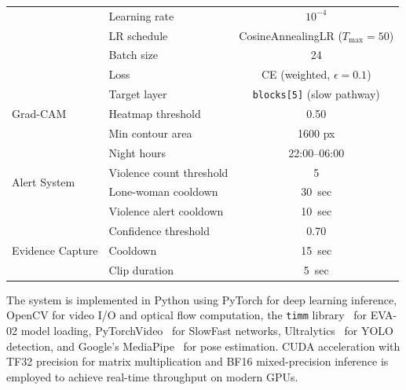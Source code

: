 \documentclass[11pt,a4paper]{article}
\begin{document}
\begin{table}[H]
\begin{tabular}{@{}llc@{}}
& Learning rate & $10^{-4}$ \\
& LR schedule & CosineAnnealingLR ($T_{\max}\!=\!50$) \\
& Batch size & 24 \\
& Loss & CE (weighted, $\epsilon\!=\!0.1$) \\
\midrule
\multirow{3}{*}{Grad-CAM} & Target layer & \texttt{blocks[5]} (slow pathway) \\
& Heatmap threshold & 0.50 \\
& Min contour area & 1600 px \\
\midrule
\multirow{4}{*}{Alert System} & Night hours & 22:00--06:00 \\
& Violence count threshold & 5 \\
& Lone-woman cooldown & 30~sec \\
& Violence alert cooldown & 10~sec \\
\midrule
\multirow{3}{*}{Evidence Capture} & Confidence threshold & 0.70 \\
& Cooldown & 15~sec \\
& Clip duration & 5~sec \\
\bottomrule
\end{tabular}
\end{table}

The system is implemented in Python using PyTorch for deep learning inference, OpenCV for video I/O and optical flow computation, the \texttt{timm} library~\cite{timm} for EVA-02 model loading, PyTorchVideo~\cite{pytorchvideo} for SlowFast networks, Ultralytics~\cite{yolov5} for YOLO detection, and Google's MediaPipe~\cite{mediapipe} for pose estimation. CUDA acceleration with TF32 precision for matrix multiplication and BF16 mixed-precision inference is employed to achieve real-time throughput on modern GPUs.
\end{document}
